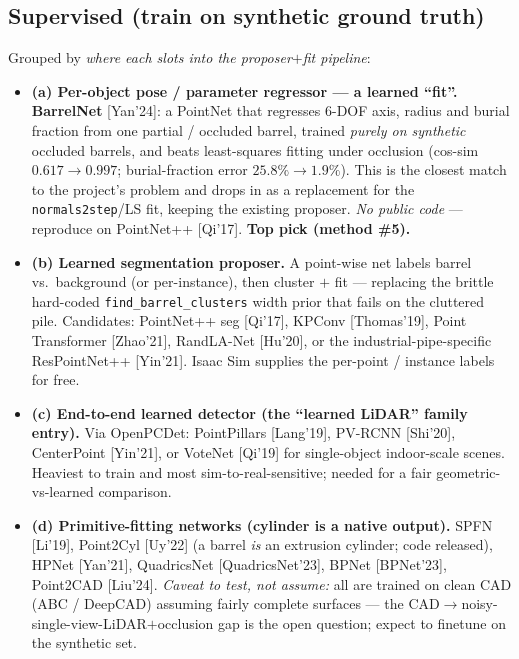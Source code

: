\documentclass[10pt,a4paper]{article}
\begin{document}
\subsection{Supervised (train on synthetic ground truth)}
Grouped by \emph{where each slots into the proposer$+$fit pipeline}:
\begin{itemize}[leftmargin=1.4em,itemsep=3pt,topsep=2pt]
  \item \textbf{(a) Per-object pose / parameter regressor --- a learned ``fit''.}
  \textbf{BarrelNet} [Yan'24]: a PointNet that regresses 6-DOF axis, radius and burial
  fraction from one partial / occluded barrel, trained \emph{purely on synthetic} occluded
  barrels, and beats least-squares fitting under occlusion (cos-sim $0.617\!\to\!0.997$;
  burial-fraction error $25.8\%\!\to\!1.9\%$). This is the closest match to the project's
  problem and drops in as a replacement for the \texttt{normals2step}/LS fit, keeping the
  existing proposer. \emph{No public code} --- reproduce on PointNet++ [Qi'17]. \textbf{Top
  pick (method \#5).}
  \item \textbf{(b) Learned segmentation proposer.} A point-wise net labels barrel
  vs.\ background (or per-instance), then cluster $+$ fit --- replacing the brittle hard-coded
  \texttt{find\_barrel\_clusters} width prior that fails on the cluttered pile. Candidates:
  PointNet++ seg [Qi'17], KPConv [Thomas'19], Point Transformer [Zhao'21], RandLA-Net
  [Hu'20], or the industrial-pipe-specific ResPointNet++ [Yin'21]. Isaac Sim supplies the
  per-point / instance labels for free.
  \item \textbf{(c) End-to-end learned detector (the ``learned LiDAR'' family entry).} Via
  OpenPCDet: PointPillars [Lang'19], PV-RCNN [Shi'20], CenterPoint [Yin'21], or VoteNet
  [Qi'19] for single-object indoor-scale scenes. Heaviest to train and most
  sim-to-real-sensitive; needed for a fair geometric-vs-learned comparison.
  \item \textbf{(d) Primitive-fitting networks (cylinder is a native output).} SPFN [Li'19],
  Point2Cyl [Uy'22] (a barrel \emph{is} an extrusion cylinder; code released), HPNet
  [Yan'21], QuadricsNet [QuadricsNet'23], BPNet [BPNet'23], Point2CAD [Liu'24]. \emph{Caveat
  to test, not assume:} all are trained on clean CAD (ABC / DeepCAD) assuming fairly complete
  surfaces --- the CAD$\to$noisy-single-view-LiDAR$+$occlusion gap is the open question;
  expect to finetune on the synthetic set.
\end{itemize}
\end{document}
